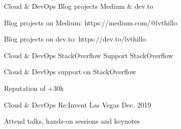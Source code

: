 \begin{cventries}
  \cventry
    {Cloud \& DevOps} %
    {Blog projects} %
    {Medium \& dev.to} %
    {} %
    {
      \begin{cvitems} %
        \item {Blog projects on Medium: https://medium.com/@lvthillo}
        \item {Blog projects on dev.to: https://dev.to/lvthillo}
      \end{cvitems}
    }

  \cventry
    {Cloud \& DevOps} %
    {StackOverflow Support} %
    {StackOverflow} %
    {} %
    {
      \begin{cvitems} %
        \item {Cloud \& DevOps support on StackOverflow}
        \item {Reputation of +30k}
      \end{cvitems}
    }

  \cventry
    {Cloud \& DevOps} %
    {Re:Invent} %
    {Las Vegas} %
    {Dec. 2019} %
    {
      \begin{cvitems} %
        \item {Attend talks, hands-on sessions and keynotes}
      \end{cvitems}
    }

\end{cventries}
